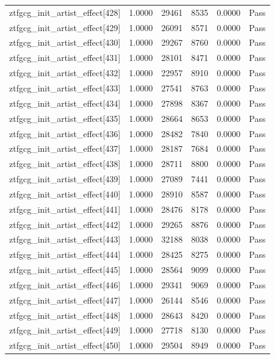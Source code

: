 \begin{table}[htbp]
\begin{tabular}{llrrll}
ztfgcg\_init\_artist\_effect[428] & 1.0000 & 29461 & 8535 & 0.0000 & Pass \\
ztfgcg\_init\_artist\_effect[429] & 1.0000 & 26091 & 8571 & 0.0000 & Pass \\
ztfgcg\_init\_artist\_effect[430] & 1.0000 & 29267 & 8760 & 0.0000 & Pass \\
ztfgcg\_init\_artist\_effect[431] & 1.0000 & 28101 & 8471 & 0.0000 & Pass \\
ztfgcg\_init\_artist\_effect[432] & 1.0000 & 22957 & 8910 & 0.0000 & Pass \\
ztfgcg\_init\_artist\_effect[433] & 1.0000 & 27541 & 8763 & 0.0000 & Pass \\
ztfgcg\_init\_artist\_effect[434] & 1.0000 & 27898 & 8367 & 0.0000 & Pass \\
ztfgcg\_init\_artist\_effect[435] & 1.0000 & 28664 & 8653 & 0.0000 & Pass \\
ztfgcg\_init\_artist\_effect[436] & 1.0000 & 28482 & 7840 & 0.0000 & Pass \\
ztfgcg\_init\_artist\_effect[437] & 1.0000 & 28187 & 7684 & 0.0000 & Pass \\
ztfgcg\_init\_artist\_effect[438] & 1.0000 & 28711 & 8800 & 0.0000 & Pass \\
ztfgcg\_init\_artist\_effect[439] & 1.0000 & 27089 & 7441 & 0.0000 & Pass \\
ztfgcg\_init\_artist\_effect[440] & 1.0000 & 28910 & 8587 & 0.0000 & Pass \\
ztfgcg\_init\_artist\_effect[441] & 1.0000 & 28476 & 8178 & 0.0000 & Pass \\
ztfgcg\_init\_artist\_effect[442] & 1.0000 & 29265 & 8876 & 0.0000 & Pass \\
ztfgcg\_init\_artist\_effect[443] & 1.0000 & 32188 & 8038 & 0.0000 & Pass \\
ztfgcg\_init\_artist\_effect[444] & 1.0000 & 28425 & 8275 & 0.0000 & Pass \\
ztfgcg\_init\_artist\_effect[445] & 1.0000 & 28564 & 9099 & 0.0000 & Pass \\
ztfgcg\_init\_artist\_effect[446] & 1.0000 & 29341 & 9069 & 0.0000 & Pass \\
ztfgcg\_init\_artist\_effect[447] & 1.0000 & 26144 & 8546 & 0.0000 & Pass \\
ztfgcg\_init\_artist\_effect[448] & 1.0000 & 28643 & 8420 & 0.0000 & Pass \\
ztfgcg\_init\_artist\_effect[449] & 1.0000 & 27718 & 8130 & 0.0000 & Pass \\
ztfgcg\_init\_artist\_effect[450] & 1.0000 & 29504 & 8949 & 0.0000 & Pass \\

\end{tabular}
\end{table}
